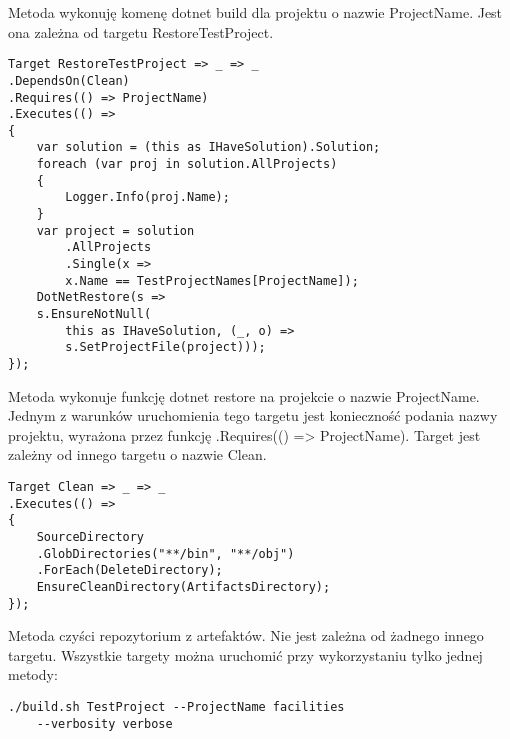 Metoda wykonuję komenę dotnet build dla projektu o nazwie ProjectName. Jest ona 
zależna od targetu RestoreTestProject.

\begin{lstlisting}
Target RestoreTestProject => _ => _
.DependsOn(Clean)
.Requires(() => ProjectName)
.Executes(() =>
{
    var solution = (this as IHaveSolution).Solution;
    foreach (var proj in solution.AllProjects)
    {
        Logger.Info(proj.Name);
    }
    var project = solution
        .AllProjects
        .Single(x => 
        x.Name == TestProjectNames[ProjectName]);
    DotNetRestore(s => 
    s.EnsureNotNull(
        this as IHaveSolution, (_, o) => 
        s.SetProjectFile(project)));
});
\end{lstlisting}

Metoda wykonuje funkcję dotnet restore na projekcie o nazwie ProjectName. Jednym z 
warunków uruchomienia tego targetu jest konieczność podania nazwy projektu, wyrażona 
przez funkcję .Requires(() => ProjectName). Target jest zależny od innego targetu o 
nazwie Clean.

\begin{lstlisting}
Target Clean => _ => _
.Executes(() =>
{
    SourceDirectory
    .GlobDirectories("**/bin", "**/obj")
    .ForEach(DeleteDirectory);
    EnsureCleanDirectory(ArtifactsDirectory);
});
\end{lstlisting}

Metoda czyści repozytorium z artefaktów. Nie jest zależna od żadnego innego targetu.
Wszystkie targety można uruchomić przy wykorzystaniu tylko jednej metody:

\begin{lstlisting}
./build.sh TestProject --ProjectName facilities 
    --verbosity verbose
\end{lstlisting}